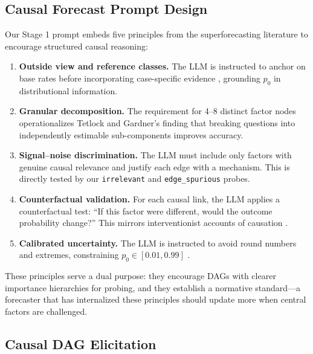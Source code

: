 \documentclass[11pt]{article}
\begin{document}
\subsection{Causal Forecast Prompt Design}
\label{sec:superforecasting}

Our Stage 1 prompt embeds five principles from the superforecasting literature \cite{tetlock2015superforecasting} to encourage structured causal reasoning:

\begin{enumerate}
    \item \textbf{Outside view and reference classes.} The LLM is instructed to anchor on base rates before incorporating case-specific evidence \cite{kahneman2011thinking}, grounding $p_0$ in distributional information.

    \item \textbf{Granular decomposition.} The requirement for 4--8 distinct factor nodes operationalizes Tetlock and Gardner's finding that breaking questions into independently estimable sub-components improves accuracy.

    \item \textbf{Signal--noise discrimination.} The LLM must include only factors with genuine causal relevance and justify each edge with a mechanism. This is directly tested by our \texttt{irrelevant} and \texttt{edge\_spurious} probes.

    \item \textbf{Counterfactual validation.} For each causal link, the LLM applies a counterfactual test: ``If this factor were different, would the outcome probability change?'' This mirrors interventionist accounts of causation \cite{woodward2005making}.

    \item \textbf{Calibrated uncertainty.} The LLM is instructed to avoid round numbers and extremes, constraining $p_0 \in [0.01, 0.99]$ \cite{baron2014heuristics}.
\end{enumerate}

These principles serve a dual purpose: they encourage DAGs with clearer importance hierarchies for probing, and they establish a normative standard---a forecaster that has internalized these principles should update more when central factors are challenged.

\subsection{Causal DAG Elicitation}
\label{sec:dag}
\end{document}
